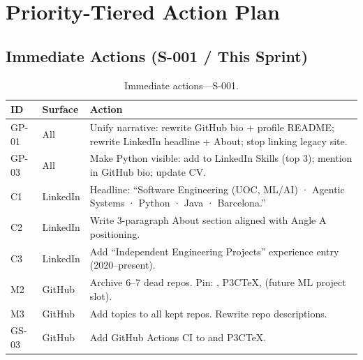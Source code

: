\documentclass[a4paper,11pt,openany]{report}
\begin{document}


\chapter{Priority-Tiered Action Plan}
\label{ch:actions}


\section{Immediate Actions (S-001 / This Sprint)}

\begin{table}[htbp]
\centering
\caption{Immediate actions---S-001.}
\label{tab:actions-immediate}
\small
\begin{tabularx}{\textwidth}{l l X}
\toprule
\textbf{ID} & \textbf{Surface} & \textbf{Action} \\
\midrule
GP-01 & All      & Unify narrative: rewrite GitHub bio + profile README; rewrite LinkedIn headline + About; stop linking legacy site. \\
GP-03 & All      & Make Python visible: add to LinkedIn Skills (top 3); mention in GitHub bio; update CV. \\
C1    & LinkedIn & Headline: ``Software Engineering (UOC, ML/AI) · Agentic Systems · Python · Java · Barcelona.'' \\
C2    & LinkedIn & Write 3-paragraph About section aligned with Angle A positioning. \\
C3    & LinkedIn & Add ``Independent Engineering Projects'' experience entry (2020--present). \\
M2    & GitHub   & Archive 6--7 dead repos. Pin: \projectName{}, P3CTeX, (future ML project slot). \\
M3    & GitHub   & Add topics to all kept repos. Rewrite repo descriptions. \\
GS-03 & GitHub   & Add GitHub Actions CI to \projectName{} and P3CTeX. \\
\bottomrule
\end{tabularx}
\end{table}
\end{document}

